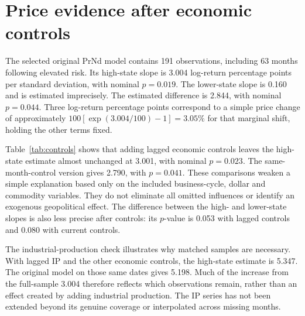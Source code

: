 \section{Price evidence after economic controls}

The selected original PrNd model contains 191 observations, including 63 months following elevated risk. Its high-state slope is 3.004 log-return percentage points per standard deviation, with nominal $p=0.019$. The lower-state slope is 0.160 and is estimated imprecisely. The estimated difference is 2.844, with nominal $p=0.044$. Three log-return percentage points correspond to a simple price change of approximately $100[\exp(3.004/100)-1]=3.05\%$ for that marginal shift, holding the other terms fixed.

Table~\ref{tab:controls} shows that adding lagged economic controls leaves the high-state estimate almost unchanged at 3.001, with nominal $p=0.023$. The same-month-control version gives 2.790, with $p=0.041$. These comparisons weaken a simple explanation based only on the included business-cycle, dollar and commodity variables. They do not eliminate all omitted influences or identify an exogenous geopolitical effect. The difference between the high- and lower-state slopes is also less precise after controls: its $p$-value is 0.053 with lagged controls and 0.080 with current controls.

\begin{table}[!htbp]
\centering\small
\caption{PrNd high-state associations with economic controls}
\label{tab:controls}
\setlength{\tabcolsep}{4pt}

\end{table}

The industrial-production check illustrates why matched samples are necessary. With lagged IP and the other economic controls, the high-state estimate is 5.347. The original model on those same dates gives 5.198. Much of the increase from the full-sample 3.004 therefore reflects which observations remain, rather than an effect created by adding industrial production. The IP series has not been extended beyond its genuine coverage or interpolated across missing months.

